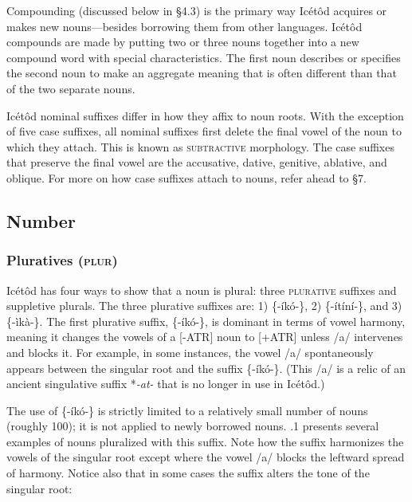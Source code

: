 Compounding (discussed below in §4.3) is the primary way Icétôd acquires or makes new nouns—besides borrowing them from other languages. Icétôd compounds are made by putting two or three nouns together into a new compound word with special characteristics. The first noun describes or specifies the second noun to make an aggregate meaning that is often different than that of the two separate nouns. 

Icétôd nominal suffixes differ in how they affix to noun roots. With the exception of five case suffixes, all nominal suffixes first delete the final vowel of the noun to which they attach. This is known as \textsc{subtractive} morphology. The case suffixes that preserve the final vowel are the accusative, dative, genitive, ablative, and oblique. For more on how case suffixes attach to nouns, refer ahead to §7.




\subsection{Number}
\subsubsection{Pluratives (\textsc{plur})}

Icétôd has four ways to show that a noun is plural: three \textsc{plurative} suffixes and suppletive plurals. The three plurative suffixes are: 1) \{-íkó-\}, 2) \{-ítíní-\}, and 3) \{-ìkà-\}. The first plurative suffix, \{-íkó-\}, is dominant in terms of vowel harmony, meaning it changes the vowels of a [-ATR] noun to [+ATR] unless /a/ intervenes and blocks it. For example, in some instances, the vowel /a/ spontaneously appears between the singular root and the suffix \{-íkó-\}. (This /a/ is a relic of an ancient singulative suffix *\textit{{}-at-} that is no longer in use in Icétôd.)

The use of \{-íkó-\} is strictly limited to a relatively small number of nouns (roughly 100); it is not applied to newly borrowed nouns. .1 presents several examples of nouns pluralized with this suffix. Note how the suffix harmonizes the vowels of the singular root except where the vowel /a/ blocks the leftward spread of harmony. Notice also that in some cases the suffix alters the tone of the singular root:


